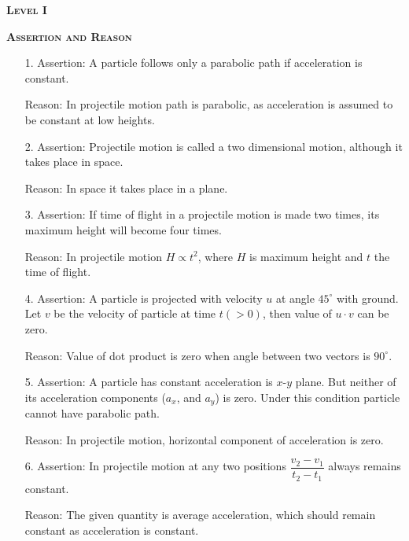 \documentclass{article}
\renewcommand{\frac}[2]{\dfrac{#1}{#2}}
\begin{document}
\pagebreak

\begin{center}
    \textsc{\textbf{Level I}}
\end{center}




\begin{center}
    \textsc{\textbf{Assertion and Reason}}
\end{center}

\begin{enumerate}[leftmargin=2cm]
    \item[1. Assertion:] A particle follows only a parabolic path if acceleration is constant.
    \item[Reason:] In projectile motion path is parabolic, as acceleration is assumed to be constant at low heights.
    
    \item[2. Assertion:] Projectile motion is called a two dimensional motion, although it takes place in space.
    \item[Reason:] In space it takes place in a plane.
    
    \item[3. Assertion:] If time of flight in a projectile motion is made two times, its maximum height will become four times.
    \item[Reason:] In projectile motion \( H \propto t^2 \), where \( H \) is maximum height and \( t \) the time of flight.
    
    \item[4. Assertion:] A particle is projected with velocity \( u \) at angle \( 45^\circ \) with ground. Let \( v \) be the velocity of particle at time \( t(> 0) \), then value of \( u \cdot v \) can be zero.
    \item[Reason:] Value of dot product is zero when angle between two vectors is \( 90^\circ \).
    
    \item[5. Assertion:] A particle has constant acceleration is \( x \)-\( y \) plane. But neither of its acceleration components (\( a_x \), and \( a_y \)) is zero. Under this condition particle cannot have parabolic path.
    \item[Reason:] In projectile motion, horizontal component of acceleration is zero.
    
    \item[6. Assertion:] In projectile motion at any two positions \( \frac{v_2 - v_1}{t_2 - t_1} \) always remains constant.
    \item[Reason:] The given quantity is average acceleration, which should remain constant as acceleration is constant.
    

\end{enumerate}
\end{document}
